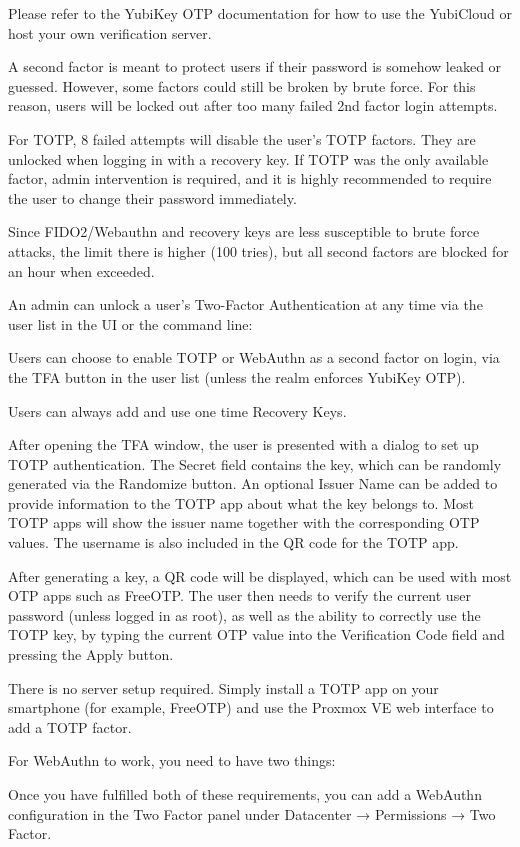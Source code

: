 Please refer to the YubiKey OTP documentation for how to use the YubiCloud or host your own verification server.

A second factor is meant to protect users if their password is somehow leaked or guessed. However, some factors could still be broken by brute force. For this reason, users will be locked out after too many failed 2nd factor login attempts.

For TOTP, 8 failed attempts will disable the user’s TOTP factors. They are unlocked when logging in with a recovery key. If TOTP was the only available factor, admin intervention is required, and it is highly recommended to require the user to change their password immediately.

Since FIDO2/Webauthn and recovery keys are less susceptible to brute force attacks, the limit there is higher (100 tries), but all second factors are blocked for an hour when exceeded.

An admin can unlock a user’s Two-Factor Authentication at any time via the user list in the UI or the command line:

Users can choose to enable TOTP or WebAuthn as a second factor on login, via the TFA button in the user list (unless the realm enforces YubiKey OTP).

Users can always add and use one time Recovery Keys.

After opening the TFA window, the user is presented with a dialog to set up TOTP authentication. The Secret field contains the key, which can be randomly generated via the Randomize button. An optional Issuer Name can be added to provide information to the TOTP app about what the key belongs to. Most TOTP apps will show the issuer name together with the corresponding OTP values. The username is also included in the QR code for the TOTP app.

After generating a key, a QR code will be displayed, which can be used with most OTP apps such as FreeOTP. The user then needs to verify the current user password (unless logged in as root), as well as the ability to correctly use the TOTP key, by typing the current OTP value into the Verification Code field and pressing the Apply button.

There is no server setup required. Simply install a TOTP app on your smartphone (for example, FreeOTP) and use the Proxmox VE web interface to add a TOTP factor.

For WebAuthn to work, you need to have two things:

Once you have fulfilled both of these requirements, you can add a WebAuthn configuration in the Two Factor panel under Datacenter → Permissions → Two Factor.

